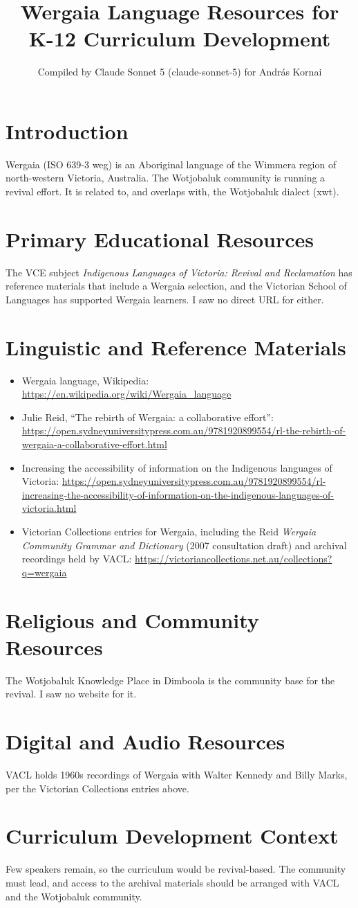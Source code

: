 \documentclass[12pt]{article}
\title{Wergaia Language Resources for K-12 Curriculum Development}
\author{Compiled by Claude Sonnet 5 (claude-sonnet-5) for Andr\'as Kornai}
\date{}
\begin{document}
\maketitle
\section{Introduction}
Wergaia (ISO 639-3 weg) is an Aboriginal language of the Wimmera region of north-western Victoria, Australia. The Wotjobaluk community is running a revival effort. It is related to, and overlaps with, the Wotjobaluk dialect (xwt).
\section{Primary Educational Resources}
The VCE subject \emph{Indigenous Languages of Victoria: Revival and Reclamation} has reference materials that include a Wergaia selection, and the Victorian School of Languages has supported Wergaia learners. I saw no direct URL for either.
\section{Linguistic and Reference Materials}
\begin{itemize}
\item Wergaia language, Wikipedia: \url{https://en.wikipedia.org/wiki/Wergaia_language}
\item Julie Reid, ``The rebirth of Wergaia: a collaborative effort'': \url{https://open.sydneyuniversitypress.com.au/9781920899554/rl-the-rebirth-of-wergaia-a-collaborative-effort.html}
\item Increasing the accessibility of information on the Indigenous languages of Victoria: \url{https://open.sydneyuniversitypress.com.au/9781920899554/rl-increasing-the-accessibility-of-information-on-the-indigenous-languages-of-victoria.html}
\item Victorian Collections entries for Wergaia, including the Reid \emph{Wergaia Community Grammar and Dictionary} (2007 consultation draft) and archival recordings held by VACL: \url{https://victoriancollections.net.au/collections?q=wergaia}
\end{itemize}
\section{Religious and Community Resources}
The Wotjobaluk Knowledge Place in Dimboola is the community base for the revival. I saw no website for it.
\section{Digital and Audio Resources}
VACL holds 1960s recordings of Wergaia with Walter Kennedy and Billy Marks, per the Victorian Collections entries above.
\section{Curriculum Development Context}
Few speakers remain, so the curriculum would be revival-based. The community must lead, and access to the archival materials should be arranged with VACL and the Wotjobaluk community.
\end{document}
